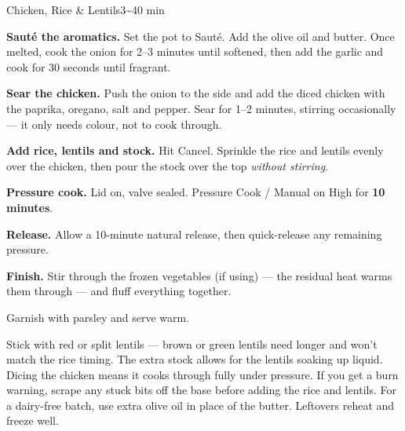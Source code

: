 \begin{recipebox}{Chicken, Rice \& Lentils}{3}{\textasciitilde40 min}
\begin{method}
  \item \textbf{Saut\'e the aromatics.} Set the pot to Saut\'e. Add the olive
        oil and butter. Once melted, cook the onion for 2--3 minutes until
        softened, then add the garlic and cook for 30 seconds until fragrant.
  \item \textbf{Sear the chicken.} Push the onion to the side and add the
        diced chicken with the paprika, oregano, salt and pepper. Sear for
        1--2 minutes, stirring occasionally --- it only needs colour, not to
        cook through.
  \item \textbf{Add rice, lentils and stock.} Hit Cancel. Sprinkle the rice
        and lentils evenly over the chicken, then pour the stock over the top
        \emph{without stirring}.
  \item \textbf{Pressure cook.} Lid on, valve sealed. Pressure Cook / Manual on
        High for \textbf{10 minutes}.
  \item \textbf{Release.} Allow a 10-minute natural release, then quick-release
        any remaining pressure.
  \item \textbf{Finish.} Stir through the frozen vegetables (if using) --- the
        residual heat warms them through --- and fluff everything together.
  \item Garnish with parsley and serve warm.
\end{method}

\begin{notes}
Stick with red or split lentils --- brown or green lentils need longer and
won't match the rice timing. The extra stock allows for the lentils soaking up
liquid. Dicing the chicken means it cooks through fully under pressure. If you
get a burn warning, scrape any stuck bits off the base before adding the rice
and lentils. For a dairy-free batch, use extra olive oil in place of the butter.
Leftovers reheat and freeze well.
\end{notes}

\end{recipebox}

